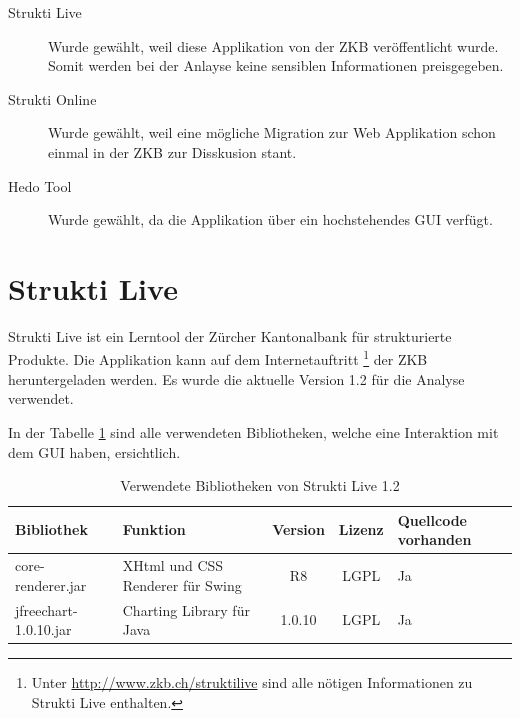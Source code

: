   \begin{description}
  \item[Strukti Live]
  Wurde gewählt, weil diese Applikation von der ZKB veröffentlicht wurde. Somit
  werden bei der Anlayse keine sensiblen Informationen preisgegeben.
  
  \item[Strukti Online]
  Wurde gewählt, weil eine mögliche Migration zur Web Applikation schon einmal
  in der \ac{ZKB} zur Disskusion stant.
  
  \item[Hedo Tool]
  Wurde gewählt, da die Applikation über ein hochstehendes \ac{GUI} verfügt.
  \end{description}
  
  \section{Strukti Live}
  
  Strukti Live ist ein Lerntool der Zürcher Kantonalbank für strukturierte
  Produkte. Die Applikation kann auf dem Internetauftritt \footnote{Unter 
  \url{http://www.zkb.ch/struktilive} sind alle nötigen Informationen zu Strukti
  Live enthalten.} der \ac{ZKB} heruntergeladen werden. Es wurde die aktuelle
  Version 1.2 für die Analyse verwendet.
  
  In der Tabelle \ref{tab:bibliothekenStruktiLive} sind alle verwendeten
  Bibliotheken, welche eine Interaktion mit dem \ac{GUI} haben, ersichtlich.
  \newline
  
  \begin{table}[ht]
    \sffamily 
    \begin{center}
      \begin{tabular}{lp{4.5cm}ccp{2cm}}
        \toprule
        \textbf{Bibliothek} & \textbf{Funktion} & \textbf{Version} &
        \textbf{Lizenz} & \textbf{Quellcode vorhanden}\\
        \midrule
        core-renderer.jar & XHtml und CSS Renderer für Swing & R8 & LGPL & Ja\\
        jfreechart-1.0.10.jar & Charting Library für Java & 1.0.10 & LGPL & Ja\\
        \bottomrule
      \end{tabular}
      \caption{Verwendete Bibliotheken von Strukti Live 1.2}
      \label{tab:bibliothekenStruktiLive}
    \end{center}
  \end{table}
  
